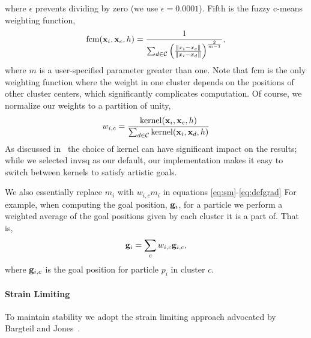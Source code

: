 \documentclass[review]{acmsiggraph}
\begin{document}
where $\epsilon$ prevents dividing by zero (we use $\epsilon = 0.0001$).
Fifth is the fuzzy c-means weighting function,
\begin{equation}
\label{eq:fuzzycmeans}
\mathrm{fcm}(\mathit{\mathbf{x}}_i, \mathit{\mathbf{x}}_{c}, h) = \frac{1}{\sum_{d\in\mathcal{C}}\left(\frac{\|x_i - x_{c}\|}{\|x_i-x_{d}\|}\right)^{\frac{2}{m-1}}},
\end{equation}
where $m$ is a user-specified parameter greater than one.
Note that $\mathrm{fcm}$ is the only weighting function where the weight in one cluster depends on the positions of other cluster centers,
which significantly complicates computation.
Of course, we normalize our weights to a partition of unity,
\begin{equation}
\label{eq:weights}
w_{i,c} = \frac{\mathrm{kernel}(\mathit{\mathbf{x}}_i, \mathit{\mathbf{x}}_{c}, h)}{\sum_{d\in\mathcal{C}}\mathrm{kernel}(\mathit{\mathbf{x}}_i, \mathit{\mathbf{x}}_{d}, h)}
\end{equation}
As discussed in~ the choice of kernel can have significant impact on the results; while we selected
$\mathrm{invsq}$ as our default, our implementation makes it easy to switch between kernels to satisfy artistic goals.

We also essentially replace $m_i$ with $w_{i,c}m_i$ in equations \eqref{eq:sm}-\eqref{eq:defgrad} 
For example, when computing the goal position, $\mathit{\mathbf{g}}_i$, for a particle we perform a weighted
average of the goal positions given by each cluster it is a part of.  That is,
\begin{equation}
\mathit{\mathbf{g}}_i = \sum_c w_{i,c}\mathit{\mathbf{g}}_{i,c},
\end{equation}
where $\mathit{\mathbf{g}}_{i,c}$ is the goal position for particle $p_i$ in cluster $c$.

\paragraph{Strain Limiting}
To maintain stability we adopt the strain limiting approach advocated by Bargteil and Jones~.
\end{document}
